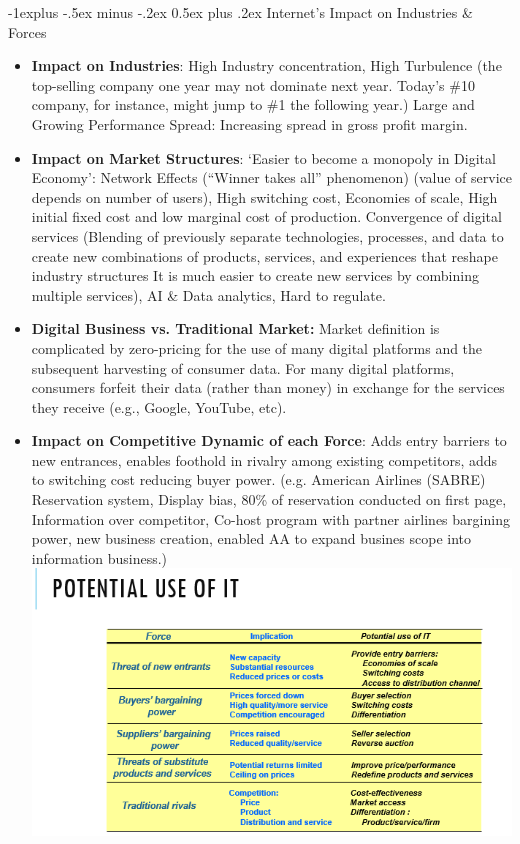 \documentclass[12pt, landscape]{article}
\makeatletter
\renewcommand{\subsection}{\@startsection{subsection}{2}{0mm}%
                                {-1explus -.5ex minus -.2ex}%
                                {0.5ex plus .2ex}%
                                {\normalfont\normalsize\bfseries}}
\makeatother
\begin{document}
\begin{multicols*}{3}
\subsection{Internet's Impact on Industries \& Forces}
\begin{itemize}
\item \textbf{Impact on Industries}: High Industry concentration, High Turbulence (the top-selling company one year may not dominate next year. Today’s \#10 company, for instance, might jump to \#1 the following year.) Large and Growing Performance Spread: Increasing spread in gross profit margin.
\item \textbf{Impact on Market Structures}: `Easier to become a monopoly in Digital Economy': Network Effects (“Winner takes all” phenomenon) (value of service depends on number of users), High switching cost, Economies of scale, High initial fixed cost and low marginal cost of production. Convergence of digital services (Blending of previously separate technologies, processes, and data to create new combinations of products, services, and experiences that reshape industry structures It is much easier to create new services by combining multiple services), AI \& Data analytics, Hard to regulate.
\item \textbf{Digital Business vs. Traditional Market:} Market definition is complicated by zero-pricing for the use of many digital platforms and the subsequent harvesting of consumer data. For many digital platforms, consumers forfeit their data (rather than money) in exchange for the services they receive (e.g., Google, YouTube, etc).
\item \textbf{Impact on Competitive Dynamic of each Force}:  Adds entry barriers to new entrances, enables foothold in rivalry among existing competitors, adds to switching cost reducing buyer power. (e.g. American Airlines (SABRE) Reservation system, Display bias, 80\% of reservation conducted on first page, Information over competitor, Co-host program with partner airlines bargining power, new business creation, enabled AA to expand busines scope into information business.)
\includegraphics[width = \linewidth]{portersIT}

\end{itemize}
\end{multicols*}
\end{document}
